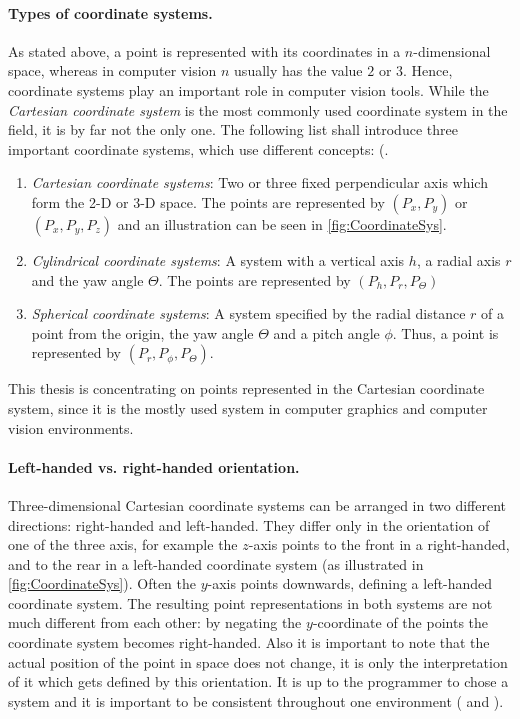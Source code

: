 \paragraph{Types of coordinate systems.}
As stated above, a point is represented with its coordinates in a $n$-dimensional space, whereas in computer vision $n$ usually has the value $2$ or $3$. Hence, coordinate systems play an important role in computer vision tools. While the \textit{Cartesian coordinate system} is the most commonly used coordinate system in the field, it is by far not the only one. The following list shall introduce three important coordinate systems, which use different concepts: (\cite[p.166 et seq.]{Gregory.2014}.  
\begin{enumerate}[i]
\item \textit{Cartesian coordinate systems}: Two or three fixed perpendicular axis which form the 2-D or 3-D space. The points are represented by $(P_x,P_y)$ or $(P_x,P_y,P_z)$ and an illustration can be seen in \autoref{fig:CoordinateSys}.  
\item \textit{Cylindrical coordinate systems}: A system with a vertical axis $h$, a radial axis $r$ and the yaw angle $\Theta$. The points are represented by $(P_h,P_r,P_\Theta)$
\item \textit{Spherical coordinate systems}: A system specified by the radial distance $r$ of a point from the origin, the yaw angle $\Theta$ and a pitch angle $\phi$. Thus, a point is represented by $(P_r,P_\phi,P_\Theta)$.
\end{enumerate}

This thesis is concentrating on points represented in the Cartesian coordinate system, since it is the mostly used system in computer graphics and computer vision environments.

\paragraph{Left-handed vs. right-handed orientation.}
Three-dimensional Cartesian coordinate systems can be arranged in two different directions: right-handed and left-handed. They differ only in the orientation of one of the three axis, for example the $z$-axis points to the front in a right-handed, and to the rear in a left-handed coordinate system (as illustrated in \autoref{fig:CoordinateSys}). Often the $y$-axis points downwards, defining a left-handed coordinate system. The resulting point representations in both systems are not much different from each other: by negating the $y$-coordinate of the points the coordinate system becomes right-handed. Also it is important to note that the actual position of the point in space does not change, it is only the interpretation of it which gets defined by this orientation. It is up to the programmer to chose a system and it is important to be consistent throughout one environment (\cite[p.164 et seq.]{Hartley.2011} and \cite[p.167 et seq.]{Gregory.2014}). 

